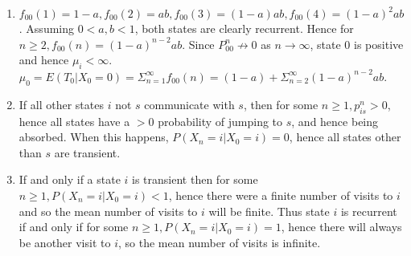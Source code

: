 \documentclass{article}
\begin{document}
\begin{enumerate}
	\item %
		$f_{00}(1) = 1 - a, f_{00}(2) = ab, f_{00}(3) = (1-a) ab, f_{00}(4) = (1-a)^2 ab$. Assuming $0 < a, b < 1$, both states are clearly recurrent. Hence for $n \ge 2, f_{00}(n) = (1-a)^{n-2} ab$. Since $P_{00}^n \not \rightarrow 0$ as $n \rightarrow \infty$, state 0 is positive and hence $\mu_i < \infty$. $\mu_0 = E(T_0|X_0=0) = \Sigma_{n=1}^\infty f_{00}(n) = (1-a) + \Sigma_{n=2}^\infty (1-a)^{n-2} ab$.
	\item %
		If all other states $i$ not $s$ communicate with $s$, then for some $n \ge 1, p_{is}^n > 0$, hence all states have a $> 0$ probability of jumping to $s$, and hence being absorbed. When this happens, $P(X_n = i | X_0 = i) = 0$, hence all states other than $s$ are transient.
	\item %
		If and only if a state $i$ is transient then for some $n \ge 1, P(X_n = i | X_0 = i) < 1$, hence there were a finite number of visits to $i$ and so the mean number of visits to $i$ will be finite. Thus state $i$ is recurrent if and only if for some $n \ge 1, P(X_n = i | X_0 = i) = 1$, hence there will always be another visit to $i$, so the mean number of visits is infinite.
\end{enumerate}
\end{document}
